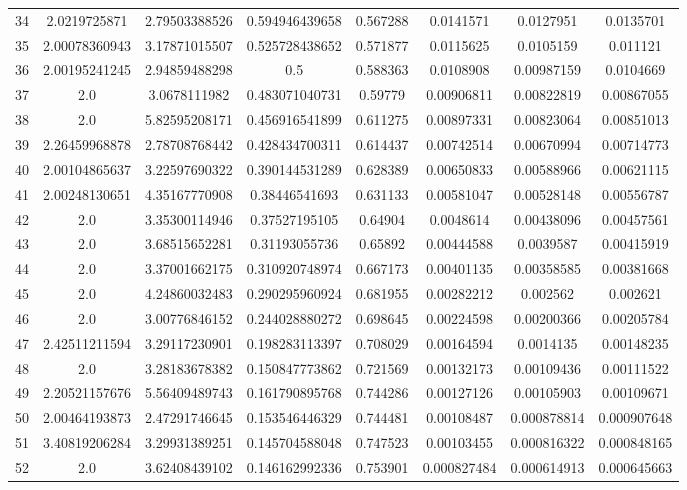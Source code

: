 \begin{longtable}{|c|c|c|c|c|c|c|c|}
34 & 2.0219725871 & 2.79503388526 & 0.594946439658 & 0.567288 & 0.0141571 & 0.0127951 & 0.0135701 \\
35 & 2.00078360943 & 3.17871015507 & 0.525728438652 & 0.571877 & 0.0115625 & 0.0105159 & 0.011121 \\
36 & 2.00195241245 & 2.94859488298 & 0.5 & 0.588363 & 0.0108908 & 0.00987159 & 0.0104669 \\
37 & 2.0 & 3.0678111982 & 0.483071040731 & 0.59779 & 0.00906811 & 0.00822819 & 0.00867055 \\
38 & 2.0 & 5.82595208171 & 0.456916541899 & 0.611275 & 0.00897331 & 0.00823064 & 0.00851013 \\
39 & 2.26459968878 & 2.78708768442 & 0.428434700311 & 0.614437 & 0.00742514 & 0.00670994 & 0.00714773 \\
40 & 2.00104865637 & 3.22597690322 & 0.390144531289 & 0.628389 & 0.00650833 & 0.00588966 & 0.00621115 \\
41 & 2.00248130651 & 4.35167770908 & 0.38446541693 & 0.631133 & 0.00581047 & 0.00528148 & 0.00556787 \\
42 & 2.0 & 3.35300114946 & 0.37527195105 & 0.64904 & 0.0048614 & 0.00438096 & 0.00457561 \\
43 & 2.0 & 3.68515652281 & 0.31193055736 & 0.65892 & 0.00444588 & 0.0039587 & 0.00415919 \\
44 & 2.0 & 3.37001662175 & 0.310920748974 & 0.667173 & 0.00401135 & 0.00358585 & 0.00381668 \\
45 & 2.0 & 4.24860032483 & 0.290295960924 & 0.681955 & 0.00282212 & 0.002562 & 0.002621 \\
46 & 2.0 & 3.00776846152 & 0.244028880272 & 0.698645 & 0.00224598 & 0.00200366 & 0.00205784 \\
47 & 2.42511211594 & 3.29117230901 & 0.198283113397 & 0.708029 & 0.00164594 & 0.0014135 & 0.00148235 \\
48 & 2.0 & 3.28183678382 & 0.150847773862 & 0.721569 & 0.00132173 & 0.00109436 & 0.00111522 \\
49 & 2.20521157676 & 5.56409489743 & 0.161790895768 & 0.744286 & 0.00127126 & 0.00105903 & 0.00109671 \\
50 & 2.00464193873 & 2.47291746645 & 0.153546446329 & 0.744481 & 0.00108487 & 0.000878814 & 0.000907648 \\
51 & 3.40819206284 & 3.29931389251 & 0.145704588048 & 0.747523 & 0.00103455 & 0.000816322 & 0.000848165 \\
52 & 2.0 & 3.62408439102 & 0.146162992336 & 0.753901 & 0.000827484 & 0.000614913 & 0.000645663 \\

\end{longtable}
